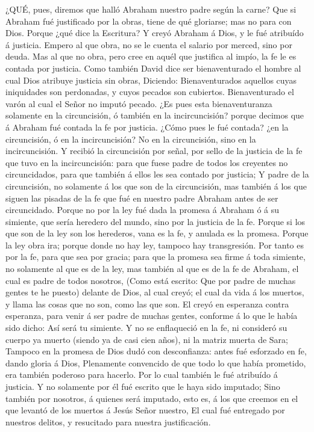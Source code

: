  ¿QUÉ, pues, diremos que halló Abraham nuestro padre según
la carne?  Que si Abraham fué justificado por la obras,
tiene de qué gloriarse; mas no para con Dios.  Porque ¿qué
dice la Escritura? Y creyó Abraham á Dios, y le fué atribuído á
justicia.  Empero al que obra, no se le cuenta el salario
por merced, sino por deuda.  Mas al que no obra, pero cree
en aquél que justifica al impío, la fe le es contada por justicia.
 Como también David dice ser bienaventurado el hombre al
cual Dios atribuye justicia sin obras,  Diciendo:
Bienaventurados aquellos cuyas iniquidades son perdonadas, y cuyos
pecados son cubiertos.  Bienaventurado el varón al cual el
Señor no imputó pecado.  ¿Es pues esta bienaventuranza
solamente en la circuncisión, ó también en la incircuncisión? porque
decimos que á Abraham fué contada la fe por justicia. 
¿Cómo pues le fué contada? ¿en la circuncisión, ó en la incircuncisión?
No en la circuncisión, sino en la incircuncisión.  Y
recibió la circuncisión por señal, por sello de la justicia de la fe que
tuvo en la incircuncisión: para que fuese padre de todos los creyentes
no circuncidados, para que también á ellos les sea contado por justicia;
 Y padre de la circuncisión, no solamente á los que son de
la circuncisión, mas también á los que siguen las pisadas de la fe que
fué en nuestro padre Abraham antes de ser circuncidado. 
Porque no por la ley fué dada la promesa á Abraham ó á su simiente, que
sería heredero del mundo, sino por la justicia de la fe. 
Porque si los que son de la ley son los herederos, vana es la fe, y
anulada es la promesa.  Porque la ley obra ira; porque
donde no hay ley, tampoco hay transgresión.  Por tanto es
por la fe, para que sea por gracia; para que la promesa sea firme á toda
simiente, no solamente al que es de la ley, mas también al que es de la
fe de Abraham, el cual es padre de todos nosotros,  (Como
está escrito: Que por padre de muchas gentes te he puesto) delante de
Dios, al cual creyó; el cual da vida á los muertos, y llama las cosas
que no son, como las que son.  El creyó en esperanza contra
esperanza, para venir á ser padre de muchas gentes, conforme á lo que le
había sido dicho: Así será tu simiente.  Y no se
enflaqueció en la fe, ni consideró su cuerpo ya muerto (siendo ya de
casi cien años), ni la matriz muerta de Sara;  Tampoco en
la promesa de Dios dudó con desconfianza: antes fué esforzado en fe,
dando gloria á Dios,  Plenamente convencido de que todo lo
que había prometido, era también poderoso para hacerlo. 
Por lo cual también le fué atribuído á justicia.  Y no
solamente por él fué escrito que le haya sido imputado; 
Sino también por nosotros, á quienes será imputado, esto es, á los que
creemos en el que levantó de los muertos á Jesús Señor nuestro,
 El cual fué entregado por nuestros delitos, y resucitado
para nuestra justificación.

